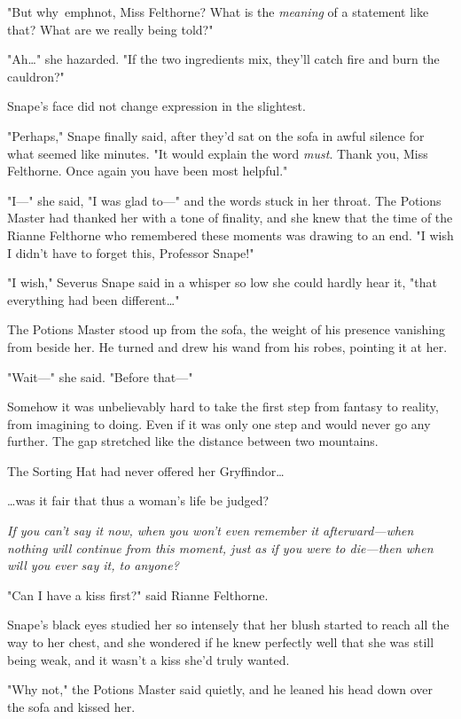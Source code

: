 "But why\ emph{not}, Miss Felthorne? What is the \emph{meaning} of a statement 
like that? What are we really being told?"

"Ah{\ldots}" she hazarded. "If the two ingredients mix, they'll catch fire and 
burn the cauldron?"

Snape's face did not change expression in the slightest.

"Perhaps," Snape finally said, after they'd sat on the sofa in awful silence 
for what seemed like minutes. "It would explain the word \emph{must}. Thank 
you, Miss Felthorne. Once again you have been most helpful."

"I---" she said, "I was glad to---" and the words stuck in her throat. The 
Potions Master had thanked her with a tone of finality, and she knew that the 
time of the Rianne Felthorne who remembered these moments was drawing to an 
end. "I wish I didn't have to forget this, Professor Snape!"

"I wish," Severus Snape said in a whisper so low she could hardly hear it, 
"that everything had been different{\ldots}"

The Potions Master stood up from the sofa, the weight of his presence vanishing 
from beside her. He turned and drew his wand from his robes, pointing it at her.

"Wait---" she said. "Before that---"

Somehow it was unbelievably hard to take the first step from fantasy to 
reality, from imagining to doing. Even if it was only one step and would never 
go any further. The gap stretched like the distance between two mountains.

The Sorting Hat had never offered her Gryffindor{\ldots}

{\ldots}was it fair that thus a woman's life be judged?

\emph{If you can't say it now, when you won't even remember it afterward---when 
nothing will continue from this moment, just as if you were to die---then when 
will you ever say it, to anyone?}

"Can I have a kiss first?" said Rianne Felthorne.

Snape's black eyes studied her so intensely that her blush started to reach all 
the way to her chest, and she wondered if he knew perfectly well that she was 
still being weak, and it wasn't a kiss she'd truly wanted.

"Why not," the Potions Master said quietly, and he leaned his head down over 
the sofa and kissed her.

